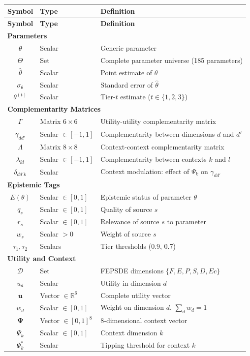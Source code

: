 \documentclass[11pt,a4paper]{article}
\theoremstyle{definition}
\begin{document}
\begin{longtable}{clp{8cm}}
\toprule
\textbf{Symbol} & \textbf{Type} & \textbf{Definition} \\
\midrule
\endfirsthead
\toprule
\textbf{Symbol} & \textbf{Type} & \textbf{Definition} \\
\midrule
\endhead

\multicolumn{3}{l}{\textbf{Parameters}} \\
$\theta$ & Scalar & Generic parameter \\
$\Theta$ & Set & Complete parameter universe (185 parameters) \\
$\hat{\theta}$ & Scalar & Point estimate of $\theta$ \\
$\sigma_\theta$ & Scalar & Standard error of $\hat{\theta}$ \\
$\theta^{(t)}$ & Scalar & Tier-$t$ estimate ($t \in \{1,2,3\}$) \\
\midrule

\multicolumn{3}{l}{\textbf{Complementarity Matrices}} \\
$\Gamma$ & Matrix $6 \times 6$ & Utility-utility complementarity matrix \\
$\gamma_{dd'}$ & Scalar $\in [-1,1]$ & Complementarity between dimensions $d$ and $d'$ \\
$\Lambda$ & Matrix $8 \times 8$ & Context-context complementarity matrix \\
$\lambda_{kl}$ & Scalar $\in [-1,1]$ & Complementarity between contexts $k$ and $l$ \\
$\delta_{dd'k}$ & Scalar & Context modulation: effect of $\Psi_k$ on $\gamma_{dd'}$ \\
\midrule

\multicolumn{3}{l}{\textbf{Epistemic Tags}} \\
$E(\theta)$ & Scalar $\in [0,1]$ & Epistemic status of parameter $\theta$ \\
$q_s$ & Scalar $\in [0,1]$ & Quality of source $s$ \\
$r_s$ & Scalar $\in [0,1]$ & Relevance of source $s$ to parameter \\
$w_s$ & Scalar $> 0$ & Weight of source $s$ \\
$\tau_1, \tau_2$ & Scalars & Tier thresholds (0.9, 0.7) \\
\midrule

\multicolumn{3}{l}{\textbf{Utility and Context}} \\
$\mathcal{D}$ & Set & FEPSDE dimensions $\{F, E, P, S, D, Ec\}$ \\
$u_d$ & Scalar & Utility in dimension $d$ \\
$\mathbf{u}$ & Vector $\in \mathbb{R}^6$ & Complete utility vector \\
$w_d$ & Scalar $\in [0,1]$ & Weight on dimension $d$, $\sum_d w_d = 1$ \\
$\boldsymbol{\Psi}$ & Vector $\in [0,1]^8$ & 8-dimensional context vector \\
$\Psi_k$ & Scalar $\in [0,1]$ & Context dimension $k$ \\
$\Psi^*_k$ & Scalar & Tipping threshold for context $k$ \\
\midrule


\end{longtable}
\end{document}
